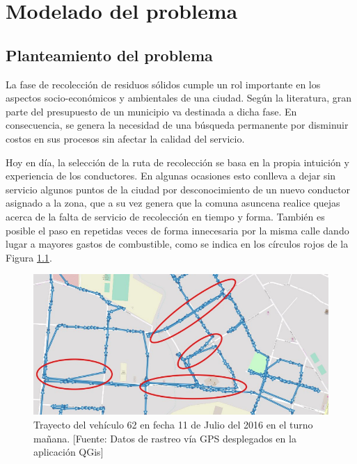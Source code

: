 \chapter{Modelado del problema}
\label{chap5}
\ifpdf
  \graphicspath{{Chapter5/Chapter5Figs/PNG/}{Chapter5/Chapter5Figs/PDF/}{Chapter5/Chapter5Figs/}}
\else
  \graphicspath{{Chapter5/Chapter5Figs/EPS/}{Chapter5/Chapter5Figs/}}
\fi


\section{Planteamiento del problema}

La fase de recolección de residuos sólidos cumple un rol importante en los aspectos socio-económicos y ambientales de una ciudad. Según la literatura, gran parte del presupuesto de un municipio va destinada a dicha fase. En consecuencia, se genera la necesidad de una búsqueda permanente por disminuir costos en sus procesos sin afectar la calidad del servicio. 

Hoy en día, la selección de la ruta de recolección se basa en la propia intuición y experiencia de los conductores. En algunas ocasiones esto conlleva a dejar sin servicio algunos puntos de la ciudad por desconocimiento de un nuevo conductor asignado a la zona, que a su vez genera que la comuna asuncena realice quejas acerca de la falta de servicio de recolección en tiempo y forma. También es posible el paso en repetidas veces de forma innecesaria por la misma calle dando lugar a mayores gastos de combustible, como se indica en los círculos rojos de la Figura \ref{fig:trayectoRecoleccion}.

\begin{figure}[tb]
    \centering
    \includegraphics[width=14.5cm]{20170329_recorrido_repetido.png}
    \caption{Trayecto del vehículo 62 en fecha 11 de Julio del 2016 en el turno mañana. [Fuente: Datos de rastreo vía GPS desplegados en la aplicación QGis]}
    \label{fig:trayectoRecoleccion}
\end{figure}

